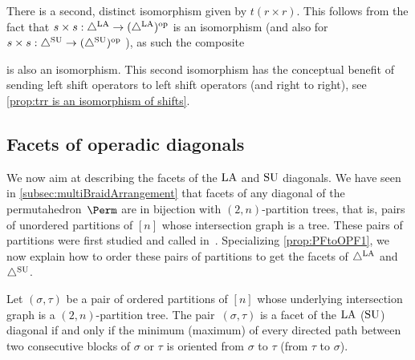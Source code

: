 \begin{remark} \label{rem:Alternate Isomorphism}
There is a second, distinct isomorphism given by $t(r\times r)$.
This follows from the fact that $s\times s:\triangle^{\mathrm{LA}} \to (\triangle^{\mathrm{LA}})^{\mathrm{op}}$ is an isomorphism (and also for  $s\times s:\triangle^{\mathrm{SU}} \to (\triangle^{\mathrm{SU}})^{\mathrm{op}}$ ), as such the composite 
\begin{center}
\end{center}
is also an isomorphism.
This second isomorphism has the conceptual benefit of sending left shift operators to left shift operators (and right to right), see \cref{prop:trr is an isomorphism of shifts}.
\end{remark}


\subsection{Facets of operadic diagonals}
\label{subsec:facets-operadic-diags}

We now aim at describing the facets of the $\mathrm{LA}$ and $\mathrm{SU}$ diagonals. 
We have seen in \cref{subsec:multiBraidArrangement} that facets of any diagonal of the permutahedron~$\Perm$ are in bijection with $(2,n)$-partition trees, that is, pairs of unordered partitions of $[n]$ whose intersection graph is a tree.
These pairs of partitions were first studied and called  in~\cite{Chen, ChenGoyal, KajitaniUenoChen}.
Specializing \cref{prop:PFtoOPF1}, we now explain how to order these pairs of partitions to get the facets of $\triangle^{\mathrm{LA}}$ and $\triangle^{\mathrm{SU}}$. 

\begin{theorem}
\label{thm:facet-ordering}
Let $(\sigma,\tau)$ be a pair of ordered partitions of $[n]$ whose underlying intersection graph is a $(2,n)$-partition tree.
The pair~$(\sigma,\tau)$ is a facet of the $\mathrm{LA}$ (\resp $\mathrm{SU}$) diagonal if and only if the minimum (\resp maximum) of every directed path between two consecutive blocks of $\sigma$ or $\tau$ is oriented from $\sigma$ to $\tau$ (\resp from $\tau$ to $\sigma$).
\end{theorem}

